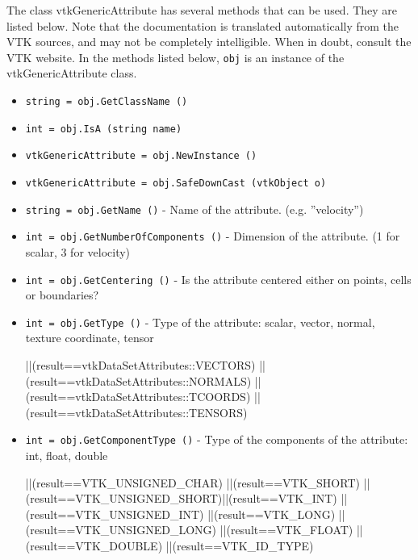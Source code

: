 The class vtkGenericAttribute has several methods that can be used.
  They are listed below.
Note that the documentation is translated automatically from the VTK sources,
and may not be completely intelligible.  When in doubt, consult the VTK website.
In the methods listed below, \verb|obj| is an instance of the vtkGenericAttribute class.
\begin{itemize}
\item  \verb|string = obj.GetClassName ()|

\item  \verb|int = obj.IsA (string name)|

\item  \verb|vtkGenericAttribute = obj.NewInstance ()|

\item  \verb|vtkGenericAttribute = obj.SafeDownCast (vtkObject o)|

\item  \verb|string = obj.GetName ()| -  Name of the attribute. (e.g. ''velocity'')
 

\item  \verb|int = obj.GetNumberOfComponents ()| -  Dimension of the attribute. (1 for scalar, 3 for velocity)
 
 
 
 

\item  \verb|int = obj.GetCentering ()| -  Is the attribute centered either on points, cells or boundaries?
 

\item  \verb|int = obj.GetType ()| -  Type of the attribute: scalar, vector, normal, texture coordinate, tensor
 
                   ||(result==vtkDataSetAttributes::VECTORS)
                   ||(result==vtkDataSetAttributes::NORMALS)
                   ||(result==vtkDataSetAttributes::TCOORDS)
                   ||(result==vtkDataSetAttributes::TENSORS)

\item  \verb|int = obj.GetComponentType ()| -  Type of the components of the attribute: int, float, double
 
                   ||(result==VTK\_UNSIGNED\_CHAR) ||(result==VTK\_SHORT)
                   ||(result==VTK\_UNSIGNED\_SHORT)||(result==VTK\_INT)
                   ||(result==VTK\_UNSIGNED\_INT)  ||(result==VTK\_LONG)
                   ||(result==VTK\_UNSIGNED\_LONG) ||(result==VTK\_FLOAT)
                   ||(result==VTK\_DOUBLE)        ||(result==VTK\_ID\_TYPE)


\end{itemize}
